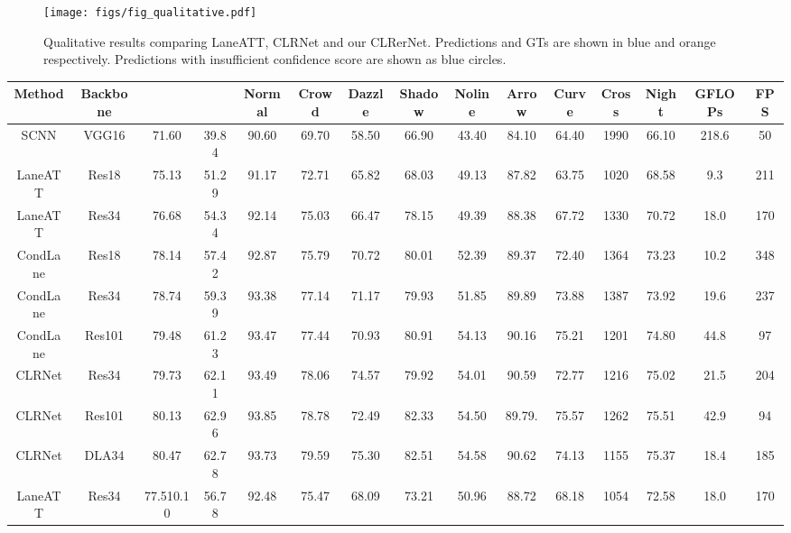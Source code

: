 \documentclass[10pt,twocolumn,letterpaper]{article}
\begin{document}
\begin{figure}[t]
\begin{center}
   \texttt{[image: figs/fig\_qualitative.pdf]}
  \end{center}
\caption{Qualitative results comparing LaneATT, CLRNet and our CLRerNet. Predictions and GTs are shown in blue and orange respectively. Predictions with insufficient confidence score are shown as blue circles.}
\label{fig:qualitative}
\end{figure}
\begin{table*}
\begin{adjustbox}{width=\textwidth} 
\begin{tabular}{ccccccccccccccc}
\hline
Method & Backbone &  &    & Normal & Crowd & Dazzle & Shadow & Noline & Arrow& Curve  & Cross & Night & GFLOPs & FPS \\
\hline
SCNN & VGG16 & 71.60 & 39.84 & 90.60 & 69.70 & 58.50 & 66.90 & 43.40 & 84.10 & 64.40 & 1990 & 66.10 & 218.6 & 50 \\
LaneATT & Res18 & 75.13 & 51.29 & 91.17 & 72.71 & 65.82 & 68.03 & 49.13 & 87.82 & 63.75 & 1020 &  68.58 & 9.3 & 211 \\
LaneATT & Res34 & 76.68 & 54.34 &  92.14 & 75.03 & 66.47 & 78.15 & 49.39 & 88.38 & 67.72 & 1330 & 70.72 & 18.0 & 170 \\
CondLane\cite{Liu_2021_ICCV} & Res18 & 78.14 & 57.42 & 92.87 & 75.79 & 70.72 & 80.01 & 52.39 & 89.37 & 72.40 & 1364 & 73.23 & 10.2& 348\\
CondLane\cite{Liu_2021_ICCV}  & Res34 & 78.74 & 59.39 & 93.38 & 77.14 &  71.17 & 79.93 & 51.85 & 89.89 & 73.88 & 1387 & 73.92 & 19.6 & 237\\
CondLane\cite{Liu_2021_ICCV}  & Res101 & 79.48 & 61.23 & 93.47 & 77.44  & 70.93 & 80.91 & 54.13 & 90.16 & 75.21 & 1201& 74.80 & 44.8 & 97\\
CLRNet\cite{Zheng_2022_CVPR} & Res34 & 79.73 & 62.11 & 93.49 & 78.06 & 74.57 & 79.92 & 54.01 & 90.59 & 72.77 & 1216  & 75.02 & 21.5 &  204 \\
CLRNet\cite{Zheng_2022_CVPR} & Res101 & 80.13 & 62.96 & 93.85 & 78.78 & 72.49 & 82.33 & 54.50  & 89.79.& 75.57 & 1262 & 75.51 & 42.9 & 94 \\
CLRNet\cite{Zheng_2022_CVPR} & DLA34 &  80.47 & 62.78 & 93.73 & 79.59 & 75.30 & 82.51 & 54.58 & 90.62 & 74.13 & 1155 & 75.37 &  18.4 &  185 \\
\hline
\hline
LaneATT & Res34 & 77.51\footnotesize{0.10} &56.78 & 92.48 & 75.47 & 68.09 & 73.21 & 50.96 & 88.72 & 68.18 & 1054 & 72.58 & 18.0 & 170 \\

\end{tabular}
\end{adjustbox}
\end{table*}
\end{document}
